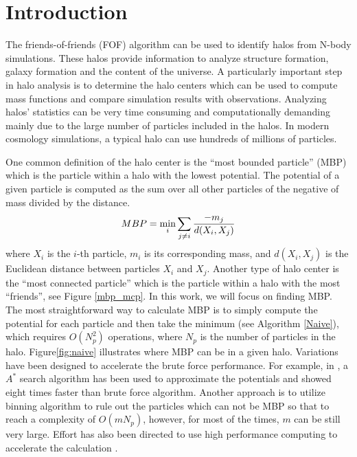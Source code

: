
\section{Introduction}
\label{sec:intro}
The friends-of-friends (FOF) algorithm can be used to identify halos from N-body simulations. These halos provide information to analyze structure formation, galaxy formation and the content of the universe. A particularly important step in halo analysis is to determine the halo centers which can be used to compute mass functions and compare simulation results with observations. 
Analyzing halos' statistics can be very time consuming and computationally demanding mainly due to the large number of particles included in the halos. In modern cosmology simulations, a typical halo can use hundreds of millions of particles.  

One common definition of the halo center is the ``most bounded particle'' (MBP) which is the particle within a halo with the lowest potential. The potential of a given particle is computed as the sum over all other particles of the negative of mass divided by the distance.  
 \[ MBP=\min_i \displaystyle\sum_{j\neq i}\frac{-m_j}{d(X_i,X_j)}\]
 where $X_i$ is the $i$-th particle, $m_i$ is its corresponding mass, and $d(X_i,X_j)$ is the Euclidean distance between particles $X_i$ and $X_j$. Another type of halo center is the ``most connected particle'' which is the particle within a halo with the most ``friends'', see Figure \ref{mbp_mcp}. In this work, we will focus on finding MBP. The most straightforward way to calculate MBP is to simply compute the potential for each particle and then take the minimum (see Algorithm \ref{Naive}), which requires $O(N_p^2)$ operations, where $N_p$ is the number of particles in the halo. Figure\ref{fig:naive} illustrates where MBP can be in a given halo. Variations have been designed to accelerate the brute force performance. For example, in \cite{fasel2011cosmology}, a $A^{*}$ search algorithm has been used to approximate the potentials and showed eight times faster than brute force algorithm. Another approach is to utilize binning algorithm to rule out the particles which can not be MBP so that to reach a complexity of $O(mN_p)$, however, for most of the times, $m$ can be still very large. Effort has also been directed to use high performance computing to accelerate the calculation \cite{sewell2015utilizing}. 


